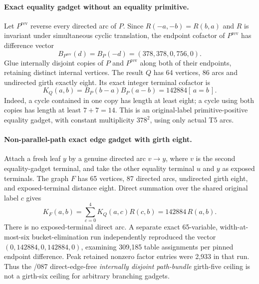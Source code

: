 \documentclass[11pt]{article}
\begin{document}
\paragraph{Exact equality gadget without an equality primitive.}
Let $P^{\mathrm{rev}}$ reverse every directed arc of $P$.
Since $R(-a,-b)=R(b,a)$ and $R$ is invariant under
simultaneous cyclic translation, the endpoint cofactor of
$P^{\mathrm{rev}}$ has difference vector
\[
B_{P^{\mathrm{rev}}}(d)=B_P(-d)
=(378,378,0,756,0).
\]
Glue internally disjoint copies of $P$ and $P^{\mathrm{rev}}$
along both of their endpoints, retaining distinct internal
vertices. The result $Q$ has 64 vertices, 86 arcs and
undirected girth exactly eight. Its exact integer
terminal cofactor is
\[
\boxed{K_Q(a,b)=B_P(b-a)B_P(a-b)
       =142884[\,a=b\,].}
\]
Indeed, a cycle contained in one copy has length at least eight;
a cycle using both copies has length at least $7+7=14$.
This is an original-label primitive-positive equality gadget,
with constant multiplicity $378^2$, using only actual T5 arcs.

\paragraph{Non-parallel-path exact edge gadget with girth eight.}
Attach a fresh leaf $y$ by a genuine directed arc $v\to y$,
where $v$ is the second equality-gadget terminal, and take
the other equality terminal $u$ and $y$ as exposed terminals.
The graph $F$ has 65 vertices, 87 directed arcs, undirected
girth eight, and exposed-terminal distance eight. Direct
summation over the shared original label $c$ gives
\[
\boxed{K_F(a,b)=\sum_{c=0}^4K_Q(a,c)R(c,b)
                   =142884\,R(a,b).}
\]
There is no exposed-terminal direct arc. A separate exact
65-variable, width-at-most-six bucket-elimination run
independently reproduced the vector
$(0,142884,0,142884,0)$, examining 309,185
table assignments per pinned endpoint difference.
Peak retained nonzero factor entries were 2,933 in that
run. Thus the /087 direct-edge-free
\emph{internally disjoint path-bundle} girth-five ceiling is
not a girth-six ceiling for arbitrary branching gadgets.
\end{document}
